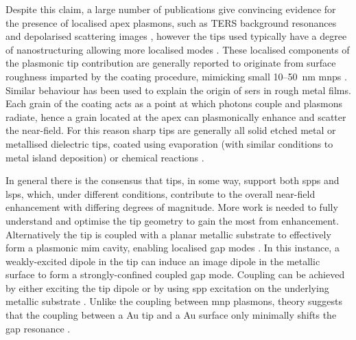 \documentclass{article}
\begin{document}
Despite this claim, a large number of publications give convincing evidence for the presence of localised apex plasmons, such as TERS background resonances \cite{pettinger2007, pettinger2009} and depolarised scattering images \cite{mino2014}, however the tips used typically have a degree of nanostructuring allowing more localised modes \cite{hayazawa2001, bailo2008, hayazawa2012, mino2014}. These localised components of the plasmonic tip contribution are generally reported to originate from surface roughness imparted by the coating procedure, mimicking small 10--\SI{50}{nm} \glspl{mnp} \cite{mino2014}. Similar behaviour has been used to explain the origin of \gls{sers} in rough metal films. Each grain of the coating acts as a point at which photons couple and plasmons radiate, hence a grain located at the apex can plasmonically enhance and scatter the near-field. For this reason sharp tips are generally all solid etched metal or metallised dielectric tips, coated using evaporation (with similar conditions to metal island deposition) \cite{hayazawa2001, hayazawa2012, mino2014} or chemical reactions \cite{bailo2008}.

In general there is the consensus that tips, in some way, support both \glspl{spp} and \glspl{lsp}, which, under different conditions, contribute to the overall near-field enhancement with differing degrees of magnitude. More work is needed to fully understand and optimise the tip geometry to gain the most from enhancement. 
Alternatively the tip is coupled with a planar metallic substrate to effectively form a plasmonic \gls{mim} cavity, enabling localised gap modes \cite{ren2004, neacsu2006, hayazawa2007, yano2007, pettinger2009, uetsuki2012, lindquist2013}. In this instance, a weakly-excited dipole in the tip can induce an image dipole in the metallic surface to form a strongly-confined coupled gap mode. Coupling can be achieved by either exciting the tip dipole or by using \gls{spp} excitation on the underlying metallic substrate \cite{hayazawa2007}. Unlike the coupling between \gls{mnp} plasmons, theory suggests that the coupling between a Au tip and a Au surface only minimally shifts the gap resonance \cite{downes2006}.
\end{document}
